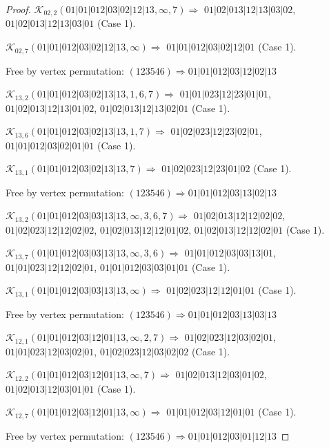 \documentclass[12pt]{article}
\theoremstyle{plain}
\theoremstyle{definition}
\theoremstyle{remark}
\newcommand{\fancy}[1]{\mathcal{#1}}
\def\K{\fancy{K}}
\begin{document}
\begin{proof}
	$\K_{02,2}(01|01|012|03|02|12|13,\infty,7)\Rightarrow $ $01|02|013|12|13|03|02$, $01|02|013|12|13|03|01$ (Case 1).
	
	$\K_{02,7}(01|01|012|03|02|12|13,\infty)\Rightarrow $ $01|01|012|03|02|12|01$ (Case 1).
	
	
	
	Free by vertex permutation: $(1 2 3 5 4 6)\Rightarrow 01|01|012|03|12|02|13$
	
	
	
	\bigskip
	
	$\K_{13,2}(01|01|012|03|02|13|13,1, 6, 7)\Rightarrow $ $01|01|023|12|23|01|01$, $01|02|013|12|13|01|02$, $01|02|013|12|13|02|01$ (Case 1).
	
	$\K_{13,6}(01|01|012|03|02|13|13,1, 7)\Rightarrow $ $01|02|023|12|23|02|01$, $01|01|012|03|02|01|01$ (Case 1).
	
	$\K_{13,1}(01|01|012|03|02|13|13,7)\Rightarrow $ $01|02|023|12|23|01|02$ (Case 1).
	
	
	
	Free by vertex permutation: $(1 2 3 5 4 6)\Rightarrow 01|01|012|03|13|02|13$
	
	
	
	\bigskip
	
	$\K_{13,2}(01|01|012|03|03|13|13,\infty,3, 6, 7)\Rightarrow $ $01|02|013|12|12|02|02$, $01|02|023|12|12|02|02$, $01|02|013|12|12|01|02$, $01|02|013|12|12|02|01$ (Case 1).
	
	$\K_{13,7}(01|01|012|03|03|13|13,\infty,3, 6)\Rightarrow $ $01|01|012|03|03|13|01$, $01|01|023|12|12|02|01$, $01|01|012|03|03|01|01$ (Case 1).
	
	$\K_{13,1}(01|01|012|03|03|13|13,\infty)\Rightarrow $ $01|02|023|12|12|01|01$ (Case 1).
	
	
	
	Free by vertex permutation: $(1 2 3 5 4 6)\Rightarrow 01|01|012|03|13|03|13$
	
	
	
	\bigskip
	
	$\K_{12,1}(01|01|012|03|12|01|13,\infty,2, 7)\Rightarrow $ $01|02|023|12|03|02|01$, $01|01|023|12|03|02|01$, $01|02|023|12|03|02|02$ (Case 1).
	
	$\K_{12,2}(01|01|012|03|12|01|13,\infty,7)\Rightarrow $ $01|02|013|12|03|01|02$, $01|02|013|12|03|01|01$ (Case 1).
	
	$\K_{12,7}(01|01|012|03|12|01|13,\infty)\Rightarrow $ $01|01|012|03|12|01|01$ (Case 1).
	
	
	
	Free by vertex permutation: $(1 2 3 5 4 6)\Rightarrow 01|01|012|03|01|12|13$
	

\end{proof}
\end{document}
